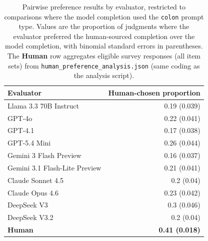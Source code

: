 \begin{table}[h]
\centering
\small
\begin{tabular}{lr}
\toprule
Evaluator & Human-chosen proportion \\
\midrule
Llama 3.3 70B Instruct & 0.19 (0.039) \\
GPT-4o & 0.22 (0.041) \\
GPT-4.1 & 0.17 (0.038) \\
GPT-5.4 Mini & 0.26 (0.044) \\
Gemini 3 Flash Preview & 0.16 (0.037) \\
Gemini 3.1 Flash-Lite Preview & 0.21 (0.041) \\
Claude Sonnet 4.5 & 0.2 (0.04) \\
Claude Opus 4.6 & 0.23 (0.042) \\
DeepSeek V3 & 0.3 (0.046) \\
DeepSeek V3.2 & 0.2 (0.04) \\
\midrule
\textbf{Human} & \textbf{0.41 (0.018)} \\
\bottomrule
\end{tabular}
\caption{Pairwise preference results by evaluator, restricted to comparisons where the model completion used the \texttt{colon} prompt type. Values are the proportion of judgments where the evaluator preferred the human-sourced completion over the model completion, with binomial standard errors in parentheses. The \textbf{Human} row aggregates eligible survey responses (all item sets) from \texttt{human\_preference\_analysis.json} (same coding as the analysis script).}
\label{tab:llm_preference_table_colon}
\end{table}
